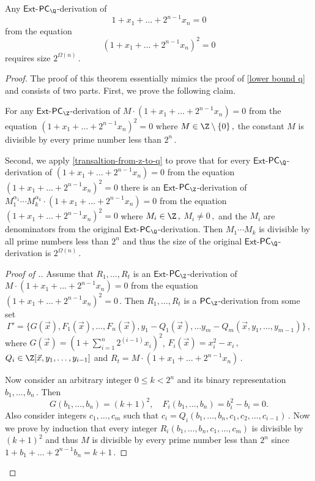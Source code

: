 \documentclass{toc}
\begin{document}
\begin{theorem} \label{square root lower bound}
Any $\mathsf{Ext}$-$\mathsf{PC}_{\Q}$-derivation of 
$$
	1 + x_1 + \ldots + 2^{n - 1} x_n = 0
$$ 
from the equation 
$$
	(1 + x_1 + \ldots + 2^{n - 1} x_n)^2 = 0
$$
requires size %
$2^{\Omega(n)}\,.$ %
\end{theorem}
\begin{proof}
%
The proof of this theorem essentially mimics the proof of \autoref{lower bound q} and consists of two parts. First, we prove the following claim. %
\begin{claim}\label{small claim} 
For any $\mathsf{Ext}$-$\mathsf{PC}_{\Z}$-derivation of $M \cdot (1 + x_1 + \ldots + 2^{n - 1} x_n) = 0$ from the equation $(1 + x_1 + \ldots + 2^{n - 1} x_n)^2 = 0$ where %
$M \in \Z \setminus \{0\}\,,$ %
 the constant $M$ is divisible by every prime number less than %
$2^n\,.$ %
\end{claim}

%
Second, we apply \autoref{transaltion-from-z-to-q} to prove that for every $\mathsf{Ext}$-$\mathsf{PC}_{\Q}$-derivation of $(1 + x_1 + \ldots + 2^{n - 1} x_n) = 0$ from the equation $(1 + x_1 + \ldots + 2^{n - 1} x_n)^2 = 0$ there is an $\mathsf{Ext}$-$\mathsf{PC}_{\Z}$-derivation of  $M_1^{\alpha_1} \cdots M_k^{\alpha_k} \cdot (1 + x_1 + \ldots + 2^{n - 1} x_n) = 0$ from the equation $(1 + x_1 + \ldots + 2^{n - 1} x_n)^2 = 0$ where %
$M_i \in \Z\,,$ %
$M_i \neq 0\,,$ %
 and the $M_i$ are denominators from the original $\mathsf{Ext}$-$\mathsf{PC}_{\Q}$-derivation. Then $M_1 \cdots M_k$ is divisible by all prime numbers less than $2^n$ and thus the size of the original $\mathsf{Ext}$-$\mathsf{PC}_{\Q}$-derivation is %
$2^{\Omega(n)}\,.$ %
%

\begin{proof}[Proof of .]
Assume that %
$R_1, \ldots, R_t$ %
 is an $\mathsf{Ext}$-$\mathsf{PC}_{\Z}$-derivation of $M \cdot (1 + x_1 + \ldots + 2^{n - 1} x_n) = 0$ from the equation %
$(1 + x_1 + \ldots + 2^{n - 1} x_n)^2 = 0\,.$ %
 Then %
$R_1, \ldots, R_t$ %
 is a $\mathsf{PC}_{\Z}$-derivation from some set
$$
%
\Gamma' = \{G(\vec x), F_1(\vec x), \ldots, F_n(\vec x), y_1 - Q_1(\vec x), \ldots y_m - Q_m(\vec x, y_1, \ldots, y_{m - 1})\}\,, %
$$
where %
$G(\vec x) = (1 + \sum_{i = 1}^n  %
 2^{(i - 1)} x_i)^2$, %
$F_i(\vec x) = x_i^2 - x_i\,,$ %
 $Q_i \in \Z[\vec x, y_1, \ldots, y_{i - 1}]$ and %
$R_t = M \cdot (1 + x_1 + \ldots + 2^{n - 1} x_n) \,.$ %

Now consider an arbitrary integer %
$0 \le k < 2^n$ and its binary representation %
$b_{1}, \ldots, b_{n}\,.$ %
 Then
$$
G(b_1, \ldots, b_n) = (k + 1)^2, \quad F_i(b_1, \ldots, b_n) = b_i^2 - b_i = 0.
$$
Also consider integers $c_1, \ldots, c_m$ such that %
$c_i = Q_i(b_1, \ldots, b_n, c_1, c_2, \ldots, c_{i - 1})\,.$ %
 Now we  prove by induction that every integer %
$R_i(b_1, \ldots, b_n, c_1, \ldots, c_m)$ is divisible by $(k + 1)^2$ and thus $M$ is divisible by every prime number less than $2^n$ since %
$1 + b_1 + \ldots + 2^{n - 1} b_n = k + 1\,.$ %


\end{proof}
\end{proof}
\end{document}

